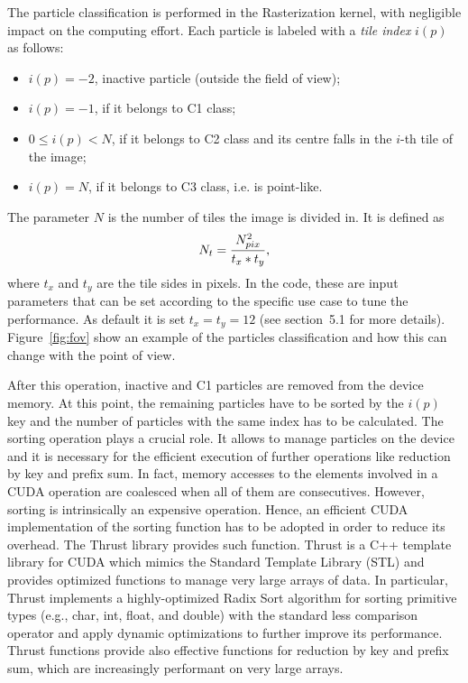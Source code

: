 \documentclass[11pt]{article}
\begin{document}
The particle classification is performed in the Rasterization kernel, with negligible impact
on the computing effort. Each particle is labeled
with a {\it tile index} $i(p)$ as follows:
\begin{itemize}
\item 
$i(p) = -2$, inactive particle (outside the field of view);
\item
$i(p) = -1$, if it belongs to C1 class; 
\item
$0 \le i(p) < N$, if it belongs to C2 class and its centre falls in the $i$-th tile of the image;  
\item
$i(p) = N$, if it belongs to C3 class, i.e. is point-like.
\end{itemize}
The parameter $N$ is the number of tiles the image is divided in. It is defined as
\begin{equation}
N_t = {N_{pix}^2\over t_x*t_y},   
\end{equation}
where $t_x$ and $t_y$ are the tile sides in pixels. In the code, these are input parameters 
that can be set according to the specific use case to tune the performance. As default it is set $t_x=t_y=12$ (see section~5.1 for more details). 
Figure~\ref{fig:fov} show an example of the particles classification and
how this can change with the point of view. 

After this operation, inactive and C1 particles are removed from the device memory. At this point, the remaining particles 
have to be sorted by the $i(p)$ key and the number of particles with the same index has to
be calculated. 
The sorting operation plays a crucial role. It allows to manage particles on the 
device and it is necessary for the efficient execution of further operations like 
reduction by key and prefix sum. In fact, memory accesses to the elements involved 
in a CUDA operation are coalesced when all of them are consecutives. However, sorting 
is intrinsically an expensive operation. Hence, an efficient CUDA implementation of
the sorting function has to be adopted in order to reduce its overhead. 
The Thrust library \cite{thrusturl} provides such function. Thrust is a C++ template library 
for CUDA which mimics the Standard Template Library (STL) and provides 
optimized functions to manage very large arrays of data. In particular, Thrust 
implements a highly-optimized Radix Sort algorithm for sorting primitive types
(e.g., char, int, float, and double) with the standard less comparison operator and 
apply dynamic optimizations to further improve its performance.
Thrust functions provide also effective functions for reduction by key and prefix sum, which are 
increasingly performant on very large arrays.
\end{document}

